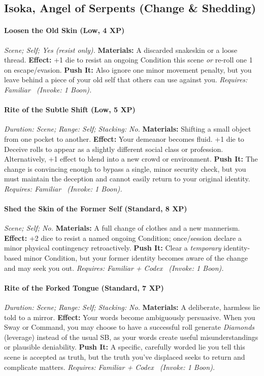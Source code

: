 \subsection{Isoka, Angel of Serpents (Change \& Shedding)}
\paragraph{Loosen the Old Skin (Low, 4 XP)} \emph{Scene; Self; Yes (resist only).}
\textbf{Materials:} A discarded snakeskin or a loose thread.
\textbf{Effect:} +1 die to resist an ongoing Condition this scene \emph{or} re-roll one 1 on escape/evasion.
\textbf{Push It:} Also ignore one minor movement penalty, but you leave behind a piece of your old self that others can use against you.
\emph{Requires: Familiar \ (\textit{Invoke:} 1 Boon).}
\paragraph{Rite of the Subtle Shift (Low, 5 XP)} \emph{Duration: Scene; Range: Self; Stacking: No.}
\textbf{Materials:} Shifting a small object from one pocket to another.
\textbf{Effect:} Your demeanor becomes fluid. +1 die to Deceive rolls to appear as a slightly different social class or profession. Alternatively, +1 effect to blend into a new crowd or environment.
\textbf{Push It:} The change is convincing enough to bypass a single, minor security check, but you must maintain the deception and cannot easily return to your original identity.
\emph{Requires: Familiar \ (\textit{Invoke:} 1 Boon).}
\paragraph{Shed the Skin of the Former Self (Standard, 8 XP)} \emph{Scene; Self; No.}
\textbf{Materials:} A full change of clothes and a new mannerism.
\textbf{Effect:} +2 dice to resist a named ongoing Condition; once/session declare a minor physical contingency retroactively.
\textbf{Push It:} Clear a \emph{temporary} identity-based minor Condition, but your former identity becomes aware of the change and may seek you out.
\emph{Requires: Familiar + Codex \ (\textit{Invoke:} 1 Boon).}
\paragraph{Rite of the Forked Tongue (Standard, 7 XP)} \emph{Duration: Scene; Range: Self; Stacking: No.}
\textbf{Materials:} A deliberate, harmless lie told to a mirror.
\textbf{Effect:} Your words become ambiguously persuasive. When you Sway or Command, you may choose to have a successful roll generate \emph{Diamonds} (leverage) instead of the usual SB, as your words create useful misunderstandings or plausible deniability.
\textbf{Push It:} A specific, carefully worded lie you tell this scene is accepted as truth, but the truth you've displaced seeks to return and complicate matters.
\emph{Requires: Familiar + Codex \ (\textit{Invoke:} 1 Boon).}
